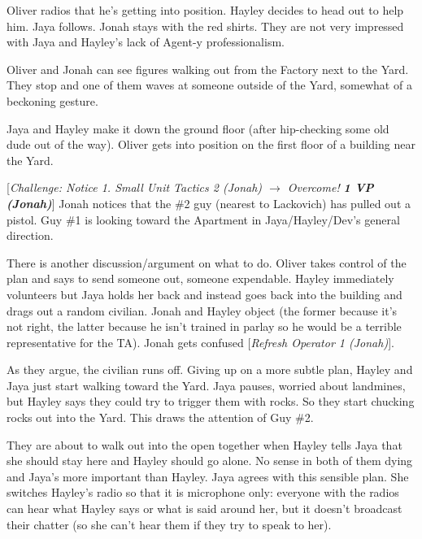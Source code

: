 Oliver radios that he's getting into position.  Hayley decides to head out to help him.  Jaya follows.  Jonah stays with the red shirts.  They are not very impressed with Jaya and Hayley's lack of Agent-y professionalism.



Oliver and Jonah can see figures walking out from the Factory next to the Yard.   They stop and one of them waves at someone outside of the Yard, somewhat of a beckoning gesture.



Jaya and Hayley make it down the ground floor (after hip-checking some old dude out of the way).  Oliver gets into position on the first floor of a building near the Yard.



{[}\textit{Challenge: Notice 1.  Small Unit Tactics 2 (Jonah) $\rightarrow$ Overcome! }\textit{\textbf{1 VP (Jonah)}}{]}  Jonah notices that the \#2 guy (nearest to Lackovich) has pulled out a pistol.  Guy \#1 is looking toward the Apartment in Jaya/Hayley/Dev's general direction. 



There is another discussion/argument on what to do.  Oliver takes control of the plan and says to send someone out, someone expendable.  Hayley immediately volunteers but Jaya holds her back and instead goes back into the building and drags out a random civilian.  Jonah and Hayley object (the former because it's not right, the latter because he isn't trained in parlay so he would be a terrible representative for the TA).   Jonah gets confused {[}\textit{Refresh Operator 1 (Jonah)}{]}.



As they argue, the civilian runs off.  Giving up on a more subtle plan, Hayley and Jaya just start walking toward the Yard.  Jaya pauses, worried about landmines, but Hayley says they could try to trigger them with rocks.  So they start chucking rocks out into the Yard.  This draws the attention of Guy \#2.



They are about to walk out into the open together when Hayley tells Jaya that she should stay here and Hayley should go alone.  No sense in both of them dying and Jaya's more important than Hayley.  Jaya agrees with this sensible plan.  She switches Hayley's radio so that it is microphone only: everyone with the radios can hear what Hayley says or what is said around her, but it doesn't broadcast their chatter (so she can't hear them if they try to speak to her).



